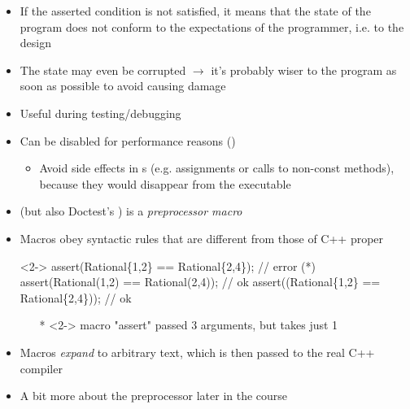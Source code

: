 \begin{frame}[fragile]{ \insertcontinuationtext}

  \begin{itemize}
  \item If the asserted condition is not satisfied, it means that the state of the
    program does not conform to the expectations of the programmer, i.e. to the
    design
  \item The state may even be corrupted $\rightarrow$ it's probably wiser to
     the program as soon as possible to avoid causing damage
  \item Useful during testing/debugging
  \item Can be disabled for performance reasons ()
    \begin{itemize}
    \item Avoid side effects in s (e.g. assignments or calls to
      non-const methods), because they would disappear from the executable
    \end{itemize}
  \end{itemize}

\end{frame}

\begin{frame}[fragile]{ \insertcontinuationtext}

  \begin{itemize}
  \item {} (but also Doctest's ) is a
    \textit{preprocessor macro}
  \item Macros obey syntactic rules that are different from those of C++ proper

    \begin{codeblock}<2->{
assert(Rational\{1\alert{,}2\} == Rational\{2\alert{,}4\});   // error (*)
assert(Rational\alert{(}1,2\alert{)} == Rational\alert{(}2,4\alert{)});   // ok
assert(\alert{(}Rational\{1,2\} == Rational\{2,4\}\alert{)}); // ok}\end{codeblock}

    {\tiny\begin{itemize}
    \item[*]<2-> macro "assert" passed 3 arguments, but takes just 1
    \end{itemize}}
  \item<3-> Macros \textit{expand} to arbitrary text, which is then passed to the
    real C++ compiler
  \item<3-> A bit more about the preprocessor later in the course
  \end{itemize}

\end{frame}

